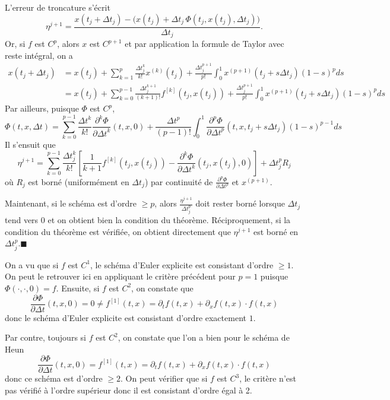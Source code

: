\hypertarget{ed2-duxe9monstration-1}{}
\begin{preuve}\label{ed2-duxe9monstration-1}
L'erreur de troncature s'écrit \[
\eta^{j+1} = \frac{x(t_j + {\Delta t}_j) - \Big( x(t_j) + {\Delta t}_j \, \Phi(t_j,x(t_j),{\Delta t}_j) \Big)}{{\Delta t}_j}.
\] Or, si \(f\) est \(C^p\), alors \(x\) est \(C^{p+1}\) et par
application la formule de Taylor avec reste intégral, on a
\begin{align*}
x(t_j + {\Delta t}_j) &= x(t_j) + \sum_{k=1}^p \frac{{\Delta t}_j^k}{k!}  x^{(k)} (t_j) +  \frac{{\Delta t}_j^{p+1}}{p!}\int_{0}^{1} x^{(p+1)}(t_j+s{\Delta t}_j)  (1-s)^p ds \\
&= x(t_j) + \sum_{k=0}^{p-1} \frac{{\Delta t}_j^{k+1}}{(k+1)!}  f^{[k]}(t_j,x(t_j)) +  \frac{{\Delta t}_j^{p+1}}{p!}\int_{0}^{1} x^{(p+1)}(t_j+s{\Delta t}_j)  (1-s)^p ds
\end{align*} Par ailleurs, puisque \(\Phi\) est \(C^p\), \[
\Phi(t,x,{\Delta t}) = \sum_{k=0}^{p-1} \frac{{\Delta t}^{k}}{k!}  \frac{\partial^k \Phi}{\partial {\Delta t}^k}(t,x,0) +  \frac{{\Delta t}^{p}}{(p-1)!}\int_{0}^{1} \frac{\partial^{p} \Phi}{\partial {\Delta t}^p}(t,x,t_j+s{\Delta t}_j)  (1-s)^{p-1} ds
\] Il s'ensuit que \[
\eta^{j+1} = \sum_{k=0}^{p-1} \frac{{\Delta t}_j^k}{k!} \left[ \frac{1}{k+1}  f^{[k]}(t_j,x(t_j)) - \frac{\partial^k \Phi}{\partial {\Delta t}^k}(t_j,x(t_j),0)\right] + {\Delta t}_j^p R_j
\] où \(R_j\) est borné (uniformément en \({\Delta t}_j\)) par
continuité de \(\frac{\partial^{p} \Phi}{\partial {\Delta t}^p}\) et
\(x^{(p+1)}\).

Maintenant, si le schéma est d'ordre \(\geq p\), alors
\(\frac{\eta^{j+1}}{{\Delta t}_j^p}\) doit rester borné lorsque
\({\Delta t}_j\) tend vers 0 et on obtient bien la condition du
théorème. Réciproquement, si la condition du théorème est vérifiée, on
obtient directement que \(\eta^{j+1}\) est borné en
\({\Delta t}_j^p\).\hfill$\blacksquare$
\end{preuve}

\hypertarget{ed2-ex_consistance_schemas}{}
\begin{exemple}\label{ed2-ex_consistance_schemas}
On a vu que si \(f\) est \(C^1\), le schéma d'Euler explicite est
consistant d'ordre \(\geq 1\). On peut le retrouver ici en appliquant le
critère précédent pour \(p=1\) puisque \(\Phi(\cdot,\cdot,0)=f\).
Ensuite, si \(f\) est \(C^2\), on constate que \[
\frac{\partial\Phi}{\partial {\Delta t}}(t,x,0) = 0 \neq f^{[1]}(t,x) =\partial_t f(t,x) + \partial_x f(t,x) \cdot f(t,x)
\] donc le schéma d'Euler explicite est consistant d'ordre exactement
\(1\).

Par contre, toujours si \(f\) est \(C^2\), on constate que l'on a bien
pour le schéma de Heun \[
\frac{\partial\Phi}{\partial {\Delta t}}(t,x,0) =  f^{[1]}(t,x) =\partial_t f(t,x) + \partial_x f(t,x) \cdot f(t,x)
\] donc ce schéma est d'ordre \(\geq 2\). On peut vérifier que si \(f\)
est \(C^3\), le critère n'est pas vérifié à l'ordre supérieur donc il
est consistant d'ordre égal à 2.
\end{exemple}



